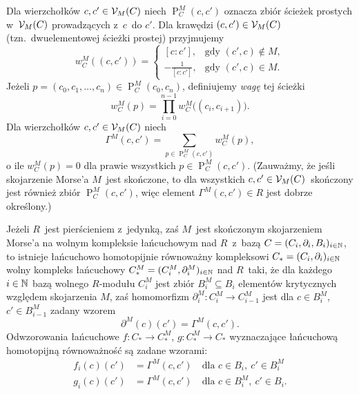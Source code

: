 Dla  wierzchołków $c,c'\in \mathcal{V}_M(C)$ niech $\operatorname{P}^M_C\left(c,c'\right)$ oznacza zbiór ścieżek prostych w~$\mathcal{V}_M(C)$ prowadzących z~$c$~do $c'$. Dla krawędzi $(c,c')\in \mathcal{V}_M(C)$ (tzn.~dwuelementowej ścieżki prostej) przyjmujemy \[w^M_C\left((c,c')\right)=\begin{cases}\left[c:c'\right], &\text{gdy } \left(c',c\right)\not\in M,\\ -\frac{1}{\left[c:c'\right]}, & \text{gdy } \left(c',c\right)\in M.\end{cases}\] Jeżeli $p=(c_0,c_1,\ldots,c_n)\in \operatorname{P}^M_C(c_0,c_n)$, definiujemy \textit{wagę} tej ścieżki \[w^M_C(p)=\prod_{i=0}^{n-1}w^M_C\bigl((c_i,c_{i+1})\bigr).\]Dla wierzchołków $c,c'\in\mathcal{V}_M(C)$ niech \[\Gamma^M\left(c,c'\right)=\sum_{p\in \operatorname{P}^M_C\left(c,c'\right)} w_C^M(p),\]o ile $w^M_C(p)=0$ dla prawie wszystkich $p\in\operatorname{P}^M_C(c,c')$. (Zauważmy, że jeśli skojarzenie Morse'a $M$~jest skończone, to dla wszystkich $c,c'\in\mathcal{V}_M(C)$~skończony jest również zbiór $\operatorname{P}^M_C(c,c')$, więc element $\Gamma^M(c,c')\in R$ jest dobrze określony.)

\begin{tw}\label{tw-glowne_tw_algebraicznej_dyskretnej_teorii_morsea}
Jeżeli $R$~jest pierścieniem z~jedynką, zaś $M$~jest skończonym skojarzeniem Morse'a na wolnym kompleksie łańcuchowym nad $R$~z~bazą $C=(C_i,\partial_i,B_i)_{i\in\mathbb{N}}$, to istnieje łańcuchowo homotopijnie równoważny kompleksowi \mbox{$C_*=(C_i,\partial_i)_{i\in\mathbb{N}}$} wolny kompleks łańcuchowy \mbox{$C_*^M=(C_i^M,\partial_i^M)_{i\in\mathbb{N}}$} nad $R$~taki, że dla każdego $i\in\mathbb{N}$ bazą wolnego $R$-modułu $C_i^M$ jest zbiór $B_i^M\subseteq B_i$ elementów krytycznych względem skojarzenia $M$, zaś homomorfizm $\partial_i^M\colon C_i^M\to C_{i-1}^M$ jest dla $c\in B_i^M$, $c'\in B_{i-1}^M$ zadany wzorem \[\partial^M(c)(c')=\Gamma^M(c,c').\]
Odwzorowania łańcuchowe $f\colon C_*\to C_*^M$, $g\colon C_*^M\to C_*$ wyznaczające łańcuchową homotopijną równoważność są zadane wzorami:
\begin{align*}
f_i(c)(c')&=\Gamma^M\left(c,c'\right)\quad \text{dla } c\in B_i,\ c'\in B_{i}^M\\
g_i(c)(c')&=\Gamma^M\left(c,c'\right)\quad \text{dla } c\in B^M_i,\ c'\in B_i.
\end{align*}
\end{tw}

